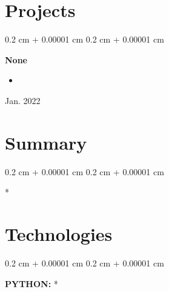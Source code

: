 \documentclass[10pt, letterpaper]{article}
\newenvironment{highlights}{
    \begin{itemize}[
        topsep=0.10 cm,
        parsep=0.10 cm,
        partopsep=0pt,
        itemsep=0pt,
        leftmargin=0.4 cm + 10pt
    ]
}{
    \end{itemize}
} %
\newenvironment{onecolentry}{
    \begin{adjustwidth}{
        0.2 cm + 0.00001 cm
    }{
        0.2 cm + 0.00001 cm
    }
}{
    \end{adjustwidth}
} %
\newenvironment{twocolentry}[2][]{
    \onecolentry
    \def\secondColumn{#2}
    \setcolumnwidth{\fill, 4.5 cm}
    \begin{paracol}{2}
}{
    \switchcolumn \raggedleft \secondColumn
    \end{paracol}
    \endonecolentry
} %
\begin{document}
    
    \section{Projects}

        
        \begin{twocolentry}{
            Jan. 2022
        }
            \textbf{None}
            \begin{highlights}
                \item \textbf{\textit{}\textbf{}}
            \end{highlights}
        \end{twocolentry}



    
    \section{Summary}

        
        \begin{onecolentry}
            \textbf{\textit{}\textbf{}}*
        \end{onecolentry}


    
    \section{Technologies}

        
        \begin{onecolentry}
            \textbf{PYTHON:} \textbf{\textit{}}*
        \end{onecolentry}


    
\end{document}
